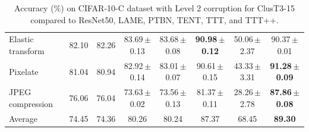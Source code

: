 \documentclass{article}
\newcommand{\ppm}{\,\scriptsize$\pm$}
\begin{document}
\begin{table}[!t]
\begin{small}
{\begin{tabular}{l|ccccccc}
        Elastic transform & 82.10 & 82.26 & 83.69\ppm0.13 & 83.68\ppm0.08 & \textbf{90.98\ppm0.12} & 50.06\ppm2.37 & 90.37\ppm0.01 \\ 
        Pixelate & 81.04 & 80.94 & 82.92\ppm0.14 & 83.01\ppm0.07 & 90.61\ppm0.15 & 43.33\ppm3.31 & \textbf{91.28\ppm0.09} \\ 
        JPEG compression & 76.06 & 76.04 & 73.63\ppm0.02 & 73.56\ppm0.13 & 81.37\ppm0.11 & 28.26\ppm2.78 & \textbf{87.86\ppm0.08} \\ \midrule
        Average & 74.45 & 74.36 & 80.26 & 80.24 & 87.37 & 68.45 & \textbf{89.30} \\ \bottomrule
    \end{tabular}}
    \end{small}
    \caption{Accuracy (\%) on CIFAR-10-C dataset with Level 2 corruption for ClusT3-15 compared to ResNet50, LAME, PTBN, TENT, TTT, and TTT++.}
	\label{tab:Cifar10cComparisonL2}
\end{table}
\end{document}
